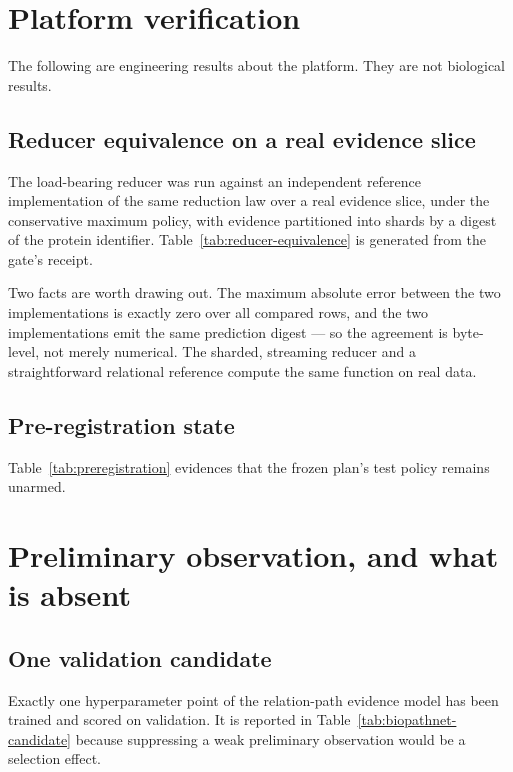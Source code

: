 \documentclass[11pt]{article}
\begin{document}
\section{Platform verification}\label{sec:verification}

The following are engineering results about the platform. They are not
biological results.

\subsection{Reducer equivalence on a real evidence slice}

The load-bearing reducer was run against an independent reference
implementation of the same reduction law over a real evidence slice, under the
conservative maximum policy, with evidence partitioned into shards by a
digest of the protein identifier. Table~\ref{tab:reducer-equivalence} is
generated from the gate's receipt.



Two facts are worth drawing out. The maximum absolute error between the two
implementations is exactly zero over all compared rows, and the two
implementations emit the same prediction digest --- so the agreement is
byte-level, not merely numerical. The sharded, streaming reducer and a
straightforward relational reference compute the same function on real data.

\subsection{Pre-registration state}

Table~\ref{tab:preregistration} evidences that the frozen plan's test policy
remains unarmed.



\section{Preliminary observation, and what is absent}

\subsection{One validation candidate}

Exactly one hyperparameter point of the relation-path evidence model has been
trained and scored on validation. It is reported in
Table~\ref{tab:biopathnet-candidate} because suppressing a weak preliminary
observation would be a selection effect.
\end{document}
